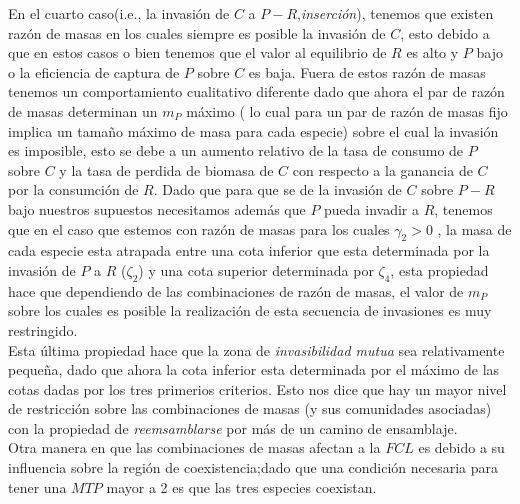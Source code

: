 En el cuarto caso(i.e., la invasi\'on de $C$ a $P-R$,\emph{inserci\'on}), tenemos que existen raz\'on de masas en los cuales siempre es posible la invasi\'on de $C$, esto debido a que en estos casos o bien tenemos que el valor al equilibrio de $R$ es alto y $P$ bajo o la eficiencia de captura de $P$ sobre $C$ es baja. Fuera de estos raz\'on de masas tenemos un comportamiento cualitativo diferente dado que ahora el par de raz\'on de masas determinan un $m_P$ m\'aximo ( lo cual para un par de raz\'on de masas fijo implica un tama\~no m\'aximo de masa para cada especie) sobre el cual la invasi\'on es imposible, esto se debe a un aumento relativo de la tasa de consumo de $P$ sobre $C$ y la tasa de perdida de biomasa de $C$ con respecto a la ganancia de $C$ por la consumci\'on de $R$. Dado que para que se de la invasi\'on de $C$ sobre $P-R$ bajo nuestros supuestos necesitamos adem\'as que $P$ pueda invadir a $R$, tenemos que en el caso que estemos con raz\'on de masas para los cuales $\gamma_2 >0$ , la masa de cada especie esta atrapada entre una cota inferior que esta determinada por la invasi\'on de $P$ a $R$ ($\zeta_2$) y una cota superior determinada por $\zeta_4$, esta propiedad hace que dependiendo de las combinaciones de raz\'on de masas, el valor de $m_P$ sobre los cuales es posible la realizaci\'on de esta secuencia de invasiones es muy restringido.\\

Esta \'ultima propiedad hace que la zona de \emph{invasibilidad mutua} sea relativamente peque\~na, dado que ahora la cota inferior esta determinada por el m\'aximo de las cotas dadas por los tres primerios criterios. Esto nos dice que hay un mayor nivel de restricci\'on sobre las combinaciones de masas (y sus comunidades asociadas) con la propiedad de \emph{reemsamblarse} por m\'as de un camino de ensamblaje.\\

Otra manera en que las combinaciones de masas afectan a la $FCL$ es debido a su influencia sobre la regi\'on de coexistencia;dado que una condici\'on necesaria para tener una $MTP$ mayor a 2 es que las tres especies coexistan.\\

